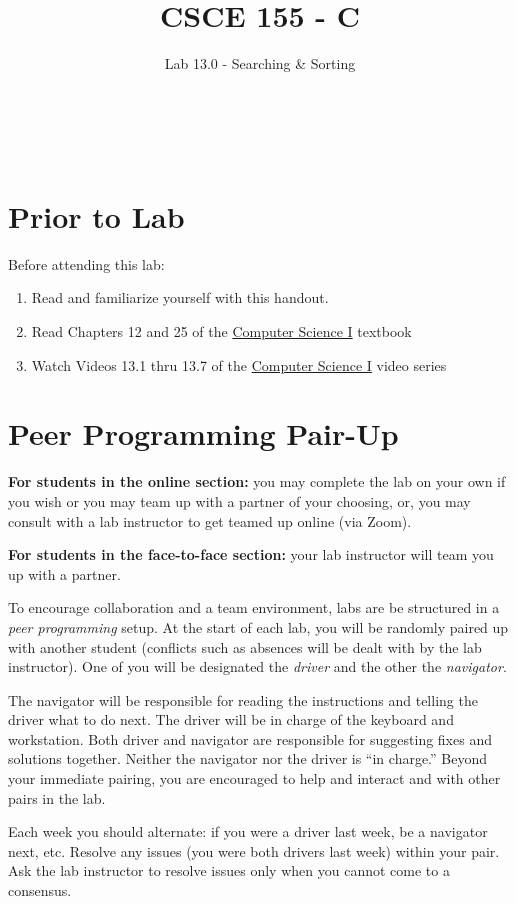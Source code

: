 \documentclass[12pt]{scrartcl}
\title{CSCE 155 - C}
\subtitle{Lab 13.0 - Searching \& Sorting}
\author{~}
\date{~}
\begin{document}
\maketitle


\section*{Prior to Lab}

Before attending this lab:
\begin{enumerate}
  \item Read and familiarize yourself with this handout.
  \item Read Chapters 12 and 25 of the \href{http://cse.unl.edu/~cbourke/ComputerScienceOne.pdf}{Computer Science I} textbook
  \item Watch Videos 13.1 thru 13.7 of the \href{https://www.youtube.com/playlist?list=PL4IH6CVPpTZVkiEnCEOdGbYsFEdtKc5Bx}{Computer Science I} video series
\end{enumerate}

\section*{Peer Programming Pair-Up}

\textbf{For students in the online section:} you may complete
the lab on your own if you wish or you may team up with a partner
of your choosing, or, you may consult with a lab instructor to get
teamed up online (via Zoom).

\textbf{For students in the face-to-face section:} your
lab instructor will team you up with a partner.

To encourage collaboration and a team environment, labs are be
structured in a \emph{peer programming} setup.  At the start of
each lab, you will be randomly paired up with another student
(conflicts such as absences will be dealt with by the lab instructor).
One of you will be designated the \emph{driver} and the other
the \emph{navigator}.

The navigator will be responsible for reading the instructions and
telling the driver what to do next.  The driver will be in charge of the
keyboard and workstation.  Both driver and navigator are responsible
for suggesting fixes and solutions together.  Neither the navigator
nor the driver is ``in charge.''  Beyond your immediate pairing, you
are encouraged to help and interact and with other pairs in the lab.

Each week you should alternate: if you were a driver last week,
be a navigator next, etc.  Resolve any issues (you were both drivers
last week) within your pair.  Ask the lab instructor to resolve issues
only when you cannot come to a consensus.
\end{document}
